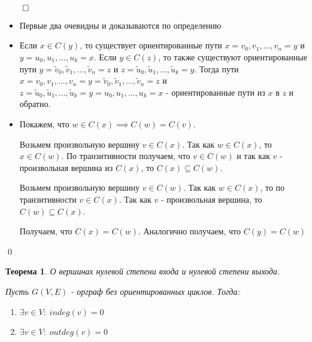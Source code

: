 \documentclass[a4paper,12pt,leqno]{article}
\theoremstyle{plain} %
\newtheorem{theorem}{Теорема}
\theoremstyle{definition} %
\renewenvironment{proof}{$\qed$}{{\qed}} %
\begin{document}
\begin{proof}

\begin{itemize}
    \item Первые два очевидны и доказываются по определению
    
    \item Если $x \in C(y)$, то существует ориентированные пути $x = v_0, v_1, \dots, v_n = y$ и $y = u_0, u_1, \dots, u_k = x$. Если $y \in C(z)$, то также существуют ориентированные пути $y = \tilde{v}_0, \tilde{v}_1, \dots, \tilde{v}_n = z$ и $z = \tilde{u}_0, \tilde{u}_1, \dots, \tilde{u}_k = y$. Тогда пути $x = v_0, v_1, \dots, v_n = y = \tilde{v}_0, \tilde{v}_1, \dots, \tilde{v}_n = z$ и $z = \tilde{u}_0, \tilde{u}_1, \dots, \tilde{u}_k = y = u_0, u_1, \dots, u_k = x$ - ориентированные пути из $x$ в $z$ и обратно.
    
    \item Покажем, что $w \in C(x) \implies C(w) = C(v)$.
    
    Возьмем произвольную вершину $v \in C(x)$. Так как $w \in C(x)$, то $x \in C(w)$. По транзитивности получаем, что $v \in C(w)$ и так как $v$ - произвольная вершина из $C(x)$, то $C(x) \subseteq C(w)$.
    
    Возьмем произвольную вершину $v \in C(w)$. Так как $w \in C(x)$, то по транзитивности $v \in C(x)$. Так как $v$ - произвольная вершина, то $C(w) \subseteq C(x)$.
    
    Получаем, что $C(x) = C(w)$. Аналогично получаем, что $C(y) = C(w)$
\end{itemize}

\end{proof}

\begin{theorem}\textit{О вершинах нулевой степени входа и нулевой степени выхода.}

Пусть $G(V, E)$ - орграф без ориентированных циклов. Тогда:

\begin{enumerate}
    \item[1)] $\exists v \in V: \; indeg(v)=0$
    \item[2)] $\exists v \in V: \; outdeg(v)=0$
\end{enumerate}

\end{theorem}
\end{document}
